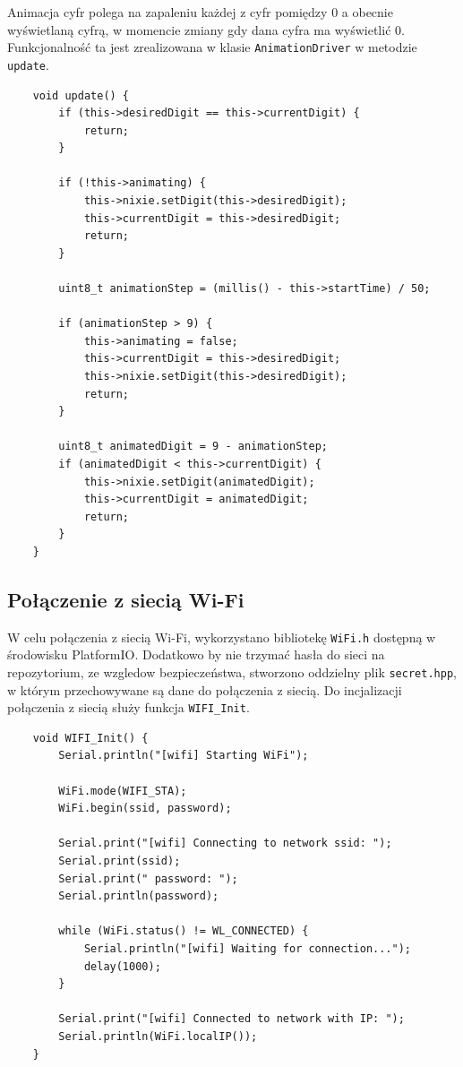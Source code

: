 \documentclass[../main.tex]{subfiles}
\begin{document}
Animacja cyfr polega na zapaleniu każdej z cyfr pomiędzy 0 a obecnie wyświetlaną cyfrą, w momencie zmiany gdy dana cyfra ma wyświetlić 0.
Funkcjonalność ta jest zrealizowana w klasie \texttt{AnimationDriver} w metodzie \texttt{update}.

\begin{verbatim}
    void update() {
        if (this->desiredDigit == this->currentDigit) {
            return;
        }

        if (!this->animating) {
            this->nixie.setDigit(this->desiredDigit);
            this->currentDigit = this->desiredDigit;
            return;
        }

        uint8_t animationStep = (millis() - this->startTime) / 50;

        if (animationStep > 9) {
            this->animating = false;
            this->currentDigit = this->desiredDigit;
            this->nixie.setDigit(this->desiredDigit);
            return;
        }

        uint8_t animatedDigit = 9 - animationStep;
        if (animatedDigit < this->currentDigit) {
            this->nixie.setDigit(animatedDigit);
            this->currentDigit = animatedDigit;
            return;
        }
    }
\end{verbatim}

\subsection{Połączenie z siecią Wi-Fi}
W celu połączenia z siecią Wi-Fi, wykorzystano bibliotekę \texttt{WiFi.h} dostępną w środowisku PlatformIO. Dodatkowo by nie trzymać hasła do sieci na repozytorium, ze wzgledow bezpieczeństwa,
stworzono oddzielny plik \texttt{secret.hpp}, w którym przechowywane są dane do połączenia z siecią. Do incjalizacji połączenia z siecią służy funkcja \texttt{WIFI\_Init}.

\begin{verbatim}
    void WIFI_Init() {
        Serial.println("[wifi] Starting WiFi");
    
        WiFi.mode(WIFI_STA);
        WiFi.begin(ssid, password);
    
        Serial.print("[wifi] Connecting to network ssid: ");
        Serial.print(ssid);
        Serial.print(" password: ");
        Serial.println(password);
    
        while (WiFi.status() != WL_CONNECTED) {
            Serial.println("[wifi] Waiting for connection...");
            delay(1000);
        }
    
        Serial.print("[wifi] Connected to network with IP: ");
        Serial.println(WiFi.localIP());
    }
\end{verbatim}
\end{document}
